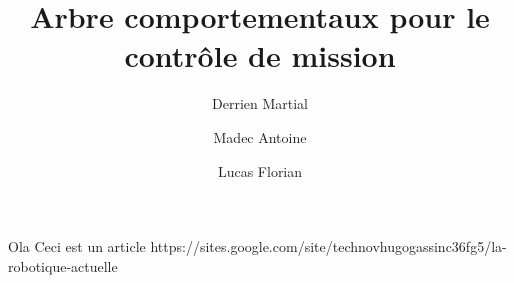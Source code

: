 \documentclass[titlepage]{article}
\title{Arbre comportementaux pour le contr\^ole de mission}
\author{
	Derrien Martial \\
	\and
	Madec Antoine \\
	\and
	Lucas Florian
	}
\begin{document}
	\maketitle
	Ola Ceci est un article
	https://sites.google.com/site/technovhugogassinc36fg5/la-robotique-actuelle
\end{document}
